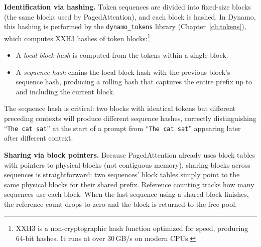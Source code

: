 \textbf{Identification via hashing.}\hspace{1em} Token sequences are divided into fixed-size blocks (the same blocks used by PagedAttention), and each block is hashed. In Dynamo, this hashing is performed by the \texttt{dynamo\_tokens} library (Chapter~\ref{ch:tokens}), which computes XXH3 hashes of token blocks:\footnote{XXH3 is a non-cryptographic hash function optimized for speed, producing 64-bit hashes. It runs at over 30\,GB/s on modern CPUs.}
\begin{itemize}
  \item A \emph{local block hash} is computed from the tokens within a single block.
  \item A \emph{sequence hash} chains the local block hash with the previous block's sequence hash, producing a rolling hash that captures the entire prefix up to and including the current block.
\end{itemize}
The sequence hash is critical: two blocks with identical tokens but different preceding contexts will produce different sequence hashes, correctly distinguishing ``\texttt{The cat sat}'' at the start of a prompt from ``\texttt{The cat sat}'' appearing later after different context.

\textbf{Sharing via block pointers.}\hspace{1em} Because PagedAttention already uses block tables with pointers to physical blocks (not contiguous memory), sharing blocks across sequences is straightforward: two sequences' block tables simply point to the same physical blocks for their shared prefix. Reference counting tracks how many sequences use each block. When the last sequence using a shared block finishes, the reference count drops to zero and the block is returned to the free pool.


